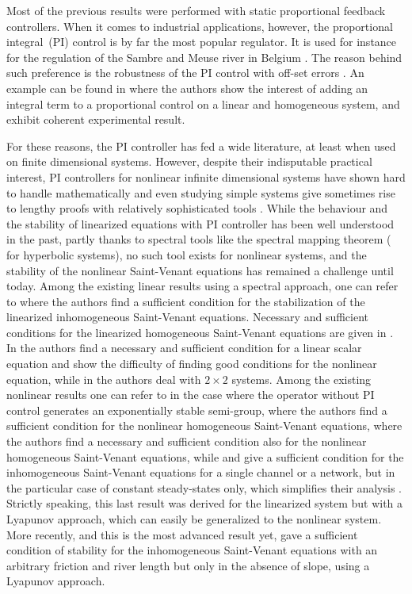 Most of the previous results were performed with static proportional feedback controllers. When it comes to industrial applications, however, the proportional integral~(PI) control is by far the most popular regulator.
It is used for instance for the regulation of the Sambre and Meuse river in Belgium \cite[Chap.\,8]{BastinCoron1D}.
The reason behind such preference is the robustness of the PI control with off-set errors \cite[Chap.\,11.3]{Astrom2}. {An example can be found in \cite{DosSantosBastinCoron}
where the authors show the interest of adding an integral term to a proportional control on a linear and homogeneous system, and exhibit coherent experimental result.}\enlargethispage{.5\baselineskip}%

For these reasons, the PI controller has fed a wide literature, at least when used on finite dimensional systems.
However, despite their indisputable practical interest, PI controllers for nonlinear infinite dimensional systems have shown hard to handle mathematically
and even studying simple systems give sometimes rise to lengthy proofs with relatively sophisticated tools \cite{PItransport}.
While the behaviour and the stability of linearized equations
with PI controller
has been well understood in the past, partly thanks to spectral tools like the spectral mapping theorem (\eg \cite{Neves,Lichtner} for hyperbolic systems), no such {tool exists} for nonlinear systems, and
the stability of the nonlinear Saint-Venant equations has remained a challenge until today.
{Among the existing linear results using a spectral approach, one can refer to \cite{XuSallet,XuSallet2014} where the authors find a sufficient condition for the stabilization of the linearized inhomogeneous Saint-Venant equations.
Necessary and sufficient conditions for the linearized homogeneous Saint-Venant equations
are given in \cite[\S\S 2.2.4.1,\,3.4.4]{BastinCoron1D}.
In \cite{CoronTamasoiu2015} the authors find a necessary and sufficient condition for a linear scalar equation and show the difficulty of finding good conditions for the nonlinear equation, while
in \cite{BastinCoronTamasoiu2015} the authors deal with $2\times2$ systems.}
Among the existing nonlinear results
{one can refer to {\cite{TerrandAndrieuDos} in the case where the operator without PI control generates an exponentially stable semi-group},
\cite{Trinh2015} where the authors find a sufficient condition for the nonlinear homogeneous Saint-Venant equations,
\cite[2.2.4.2]{BastinCoron1D} where the authors find a necessary and sufficient condition also for the
nonlinear homogeneous Saint-Venant equations,
while
\cite[\S\S 5.4.4,\,5.5]{BastinCoron1D} and \cite{BastinCoron2013} give a sufficient condition for the inhomogeneous Saint-Venant equations for a single channel or a network,
but in the particular case of constant steady-states only, which simplifies their analysis \cite{C1}. Strictly speaking, this last result was derived for the linearized system
but with a Lyapunov approach, which can easily be generalized to the nonlinear system.}
More recently, and this is the most advanced result yet, \cite{BastinCoronPI} gave a sufficient condition of stability for the inhomogeneous Saint-Venant equations with an arbitrary friction and river length but only
in the absence of slope, using a Lyapunov approach.

